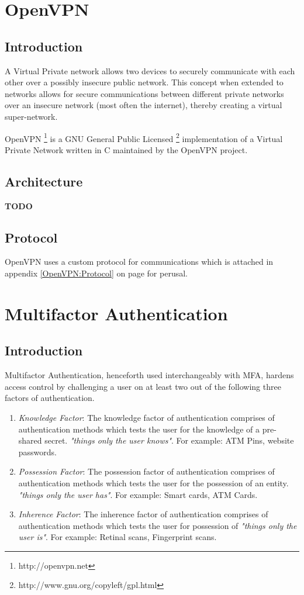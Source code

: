 \documentclass[11pt,oneside]{book}
\begin{document}
\mainmatter

\chapter{OpenVPN}
\section{Introduction}
A Virtual Private network allows two devices to securely communicate with each other
over a possibly insecure public network. This concept when extended to networks
allows for secure communications between different private networks over an
insecure network (most often the internet), thereby creating a virtual super-network.

OpenVPN \footnote{http://openvpn.net} is a GNU General Public
Licensed \footnote{http://www.gnu.org/copyleft/gpl.html} implementation of a
Virtual Private Network written in C maintained by the OpenVPN project.

\section{Architecture}
\textbf{TODO}

\section{Protocol}
OpenVPN uses a custom protocol for communications which is attached in appendix
\ref{OpenVPN:Protocol} on page \pageref{OpenVPN:Protocol} for perusal.

\chapter{Multifactor Authentication}
\section{Introduction}
Multifactor Authentication, henceforth used interchangeably with MFA, hardens access control
by challenging a user on at least two out of the following three factors of authentication.

\begin{enumerate}
    \item \emph{Knowledge Factor}: The knowledge factor of authentication comprises of
        authentication methods which tests the user for the knowledge of a pre-shared secret.
        \emph{"things only the user knows"}. For example: ATM Pins, website passwords.
    \item \emph{Possession Factor}: The possession factor of authentication comprises of
        authentication methods which tests the user for the possession of an entity.
        \emph{"things only the user has"}. For example: Smart cards, ATM Cards.
    \item \emph{Inherence Factor}: The inherence factor of authentication comprises of
        authentication methods which tests the user for possession of \emph{"things only
        the user is"}. For example: Retinal scans, Fingerprint scans.
\end{enumerate}
\end{document}

